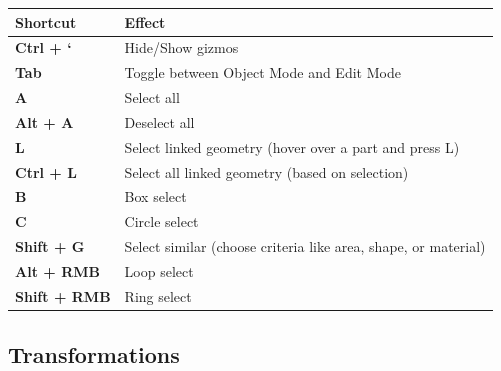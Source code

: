 \documentclass{article}
\begin{document}
\begin{longtable}{ll}
    \toprule
    \textbf{Shortcut}    & \textbf{Effect}                                                \\
    \midrule
    \endhead
    \bottomrule
    \endfoot

    \textbf{Ctrl + `}    & Hide/Show gizmos                                               \\
    \textbf{Tab}         & Toggle between Object Mode and Edit Mode                       \\
    \textbf{A}           & Select all                                                     \\
    \textbf{Alt + A}     & Deselect all                                                   \\
    \textbf{L}           & Select linked geometry (hover over a part and press L)         \\
    \textbf{Ctrl + L}    & Select all linked geometry (based on selection)                \\
    \textbf{B}           & Box select                                                     \\
    \textbf{C}           & Circle select                                                  \\
    \textbf{Shift + G}   & Select similar (choose criteria like area, shape, or material) \\
    \textbf{Alt + RMB}   & Loop select                                                    \\
    \textbf{Shift + RMB} & Ring select                                                    \\
\end{longtable}

\subsection{Transformations}
\end{document}
